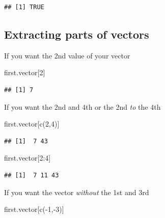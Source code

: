 \documentclass[
]{gitbook}
\newenvironment{Shaded}{\begin{snugshade}}{\end{snugshade}}
\newcommand{\DecValTok}[1]{\textcolor[rgb]{0.00,0.00,0.81}{#1}}
\newcommand{\FunctionTok}[1]{\textcolor[rgb]{0.00,0.00,0.00}{#1}}
\newcommand{\NormalTok}[1]{#1}
\newcommand{\SpecialCharTok}[1]{\textcolor[rgb]{0.00,0.00,0.00}{#1}}
\begin{document}
\begin{verbatim}
## [1] TRUE
\end{verbatim}

\hypertarget{extracting-parts-of-vectors}{%
\subsection{Extracting parts of vectors}\label{extracting-parts-of-vectors}}

If you want the 2nd value of your vector

\begin{Shaded}
\begin{Highlighting}[]
\NormalTok{first.vector[}\DecValTok{2}\NormalTok{]}
\end{Highlighting}
\end{Shaded}

\begin{verbatim}
## [1] 7
\end{verbatim}

If you want the 2nd and 4th or the 2nd \emph{to} the 4th

\begin{Shaded}
\begin{Highlighting}[]
\NormalTok{first.vector[}\FunctionTok{c}\NormalTok{(}\DecValTok{2}\NormalTok{,}\DecValTok{4}\NormalTok{)]}
\end{Highlighting}
\end{Shaded}

\begin{verbatim}
## [1]  7 43
\end{verbatim}

\begin{Shaded}
\begin{Highlighting}[]
\NormalTok{first.vector[}\DecValTok{2}\SpecialCharTok{:}\DecValTok{4}\NormalTok{]}
\end{Highlighting}
\end{Shaded}

\begin{verbatim}
## [1]  7 11 43
\end{verbatim}

If you want the vector \emph{without} the 1st and 3rd

\begin{Shaded}
\begin{Highlighting}[]
\NormalTok{first.vector[}\FunctionTok{c}\NormalTok{(}\SpecialCharTok{{-}}\DecValTok{1}\NormalTok{,}\SpecialCharTok{{-}}\DecValTok{3}\NormalTok{)]}
\end{Highlighting}
\end{Shaded}
\end{document}
